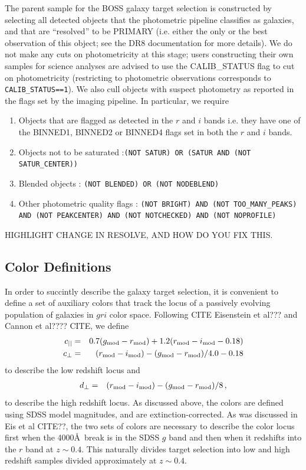 \documentclass[preprint]{aastex}
\newcommand{\cpp}{c_{\perp}}
\newcommand{\cll}{c_{||}}
\newcommand{\dpp}{d_{\perp}}
\newcommand{\gmod}{g_{\rm mod}}
\newcommand{\rmod}{r_{\rm mod}}
\newcommand{\imod}{i_{\rm mod}}
\begin{document}
The parent sample for the BOSS galaxy target selection is constructed by
selecting all detected objects that the photometric pipeline classifies as
galaxies, and that are ``resolved'' to be PRIMARY (i.e. either the only or the
best observation of this object; see the DR8 documentation for more details). We
do not make any cuts on photometricity at this stage; users constructing their
own samples for science analyses are advised to use the CALIB\_STATUS flag to
cut on photometricity (restricting to photometric observations corresponds to
\texttt{CALIB\_STATUS==1}). We also cull objects with suspect photometry as
reported in the flags set by the imaging pipeline. In particular, we require
\begin{enumerate}
  \item Objects that are flagged as detected in the $r$ and $i$ bands i.e. they
  have one of the BINNED1, BINNED2 or BINNED4 flags set in both the $r$ and $i$ bands.
  \item Objects not to be saturated :\texttt{(NOT SATUR) OR (SATUR AND (NOT
  SATUR\_CENTER))}
  \item Blended objects : \texttt{(NOT BLENDED) OR (NOT NODEBLEND)}
  \item Other photometric quality flags : \texttt{(NOT BRIGHT) AND (NOT
  TOO\_MANY\_PEAKS) AND (NOT PEAKCENTER) AND (NOT NOTCHECKED) AND (NOT
  NOPROFILE)}
\end{enumerate}

HIGHLIGHT CHANGE IN RESOLVE, AND HOW DO YOU FIX THIS. 


\subsection{Color Definitions}

In order to succintly describe the galaxy target selection, it is convenient to
define a set of auxiliary colors that track the locus of a passively evolving
population of galaxies in $gri$ color space. Following CITE Eisenstein et al???
and Cannon et al???? CITE, we define 
\begin{eqnarray}
\cll & = &  0.7 (\gmod - \rmod) + 1.2(\rmod - \imod - 0.18)  \\
\cpp & = & (\rmod - \imod) - (\gmod - \rmod)/4.0 - 0.18 
\end{eqnarray}
to describe the low redshift locus and 
\begin{eqnarray}
\dpp & = & (\rmod - \imod) - (\gmod - \rmod)/8 \,,
\end{eqnarray}
to describe the high redshift locus. As discussed above, the colors are defined
using SDSS model magnitudes, and are extinction-corrected. As was discussed in
Eis et al CITE??, the two sets of colors are necessary to describe the color
locus first when the 4000\AA\ break is in the SDSS $g$ band and then when it
redshifts into the $r$ band at $z\sim0.4$. This naturally divides target
selection into low and high redshift samples divided approximately at
$z\sim0.4$. 
\end{document}
